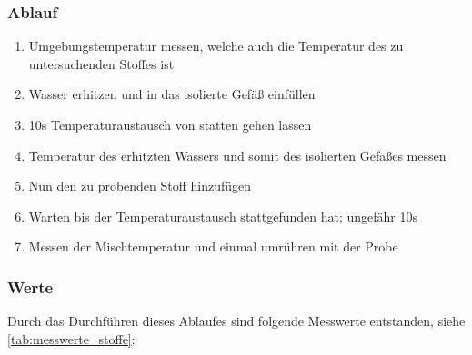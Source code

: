 \documentclass[11pt, ngerman]{scrartcl}
\begin{document}
\subsubsection{Ablauf}
\begin{enumerate}
	\item Umgebungstemperatur messen, welche auch die Temperatur des zu untersuchenden Stoffes ist
	\item Wasser erhitzen und in das isolierte Gefäß einfüllen
	\item 10s Temperaturaustausch von statten gehen lassen
	\item Temperatur des erhitzten Wassers und somit des isolierten Gefäßes messen
	\item Nun den zu probenden Stoff hinzufügen
	\item Warten bis der Temperaturaustausch stattgefunden hat; ungefähr 10s
	\item Messen der Mischtemperatur und einmal umrühren mit der Probe
\end{enumerate}

\subsubsection{Werte}
Durch das Durchführen dieses Ablaufes sind folgende Messwerte entstanden, siehe
\autoref{tab:messwerte_stoffe}:
\end{document}

